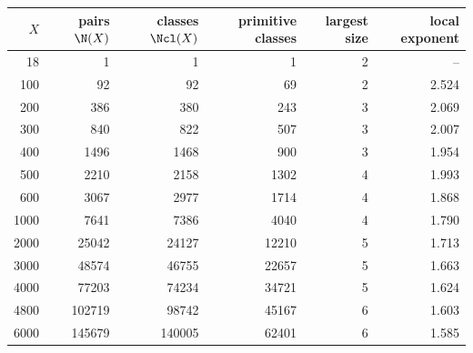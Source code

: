 \begin{tabular}{@{}rrrrrr@{}}
\toprule
$X$ & pairs $\N(X)$ & classes $\Ncl(X)$ & primitive classes & largest size & local exponent\\
\midrule
18 & 1 & 1 & 1 & 2 & -- \\
100 & 92 & 92 & 69 & 2 & 2.524 \\
200 & 386 & 380 & 243 & 3 & 2.069 \\
300 & 840 & 822 & 507 & 3 & 2.007 \\
400 & 1496 & 1468 & 900 & 3 & 1.954 \\
500 & 2210 & 2158 & 1302 & 4 & 1.993 \\
600 & 3067 & 2977 & 1714 & 4 & 1.868 \\
1000 & 7641 & 7386 & 4040 & 4 & 1.790 \\
2000 & 25042 & 24127 & 12210 & 5 & 1.713 \\
3000 & 48574 & 46755 & 22657 & 5 & 1.663 \\
4000 & 77203 & 74234 & 34721 & 5 & 1.624 \\
4800 & 102719 & 98742 & 45167 & 6 & 1.603 \\
6000 & 145679 & 140005 & 62401 & 6 & 1.585 \\
\bottomrule
\end{tabular}
